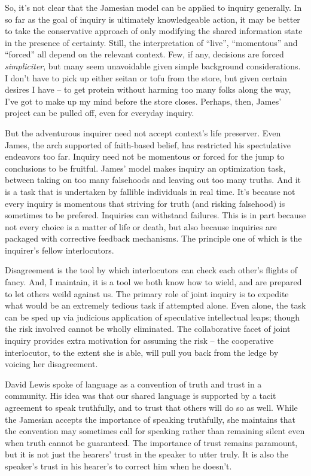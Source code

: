 \documentclass[letterpaper,10pt]{article}
\begin{document}
So, it's not clear that the Jamesian model can be applied to inquiry generally.  In so far as the goal of inquiry is ultimately knowledgeable action, it may be better to take the conservative approach of only modifying the shared information state in the presence of certainty. Still, the interpretation of ``live'', ``momentous'' and ``forced'' all depend on the relevant context.  Few, if any, decisions are forced \textit{simpliciter}, but many seem unavoidable given simple background considerations.  I don't have to pick up either seitan or tofu from the store, but given certain desires I have -- to get protein without harming too many folks along the way, I've got to make up my mind before the store closes.  Perhaps, then, James' project can be pulled off, even for everyday inquiry.

But the adventurous inquirer need not accept context's life preserver.  Even James, the arch supported of faith-based belief, has restricted his spectulative endeavors too far.  Inquiry need not be momentous or forced for the jump to conclusions to be fruitful.  James' model makes inquiry an optimization task, between taking on too many falsehoods and leaving out too many truths.  And it is a task that is undertaken by fallible individuals in real time.  It's because not every inquiry is momentous that striving for truth (and risking falsehood) is sometimes to be prefered. Inquiries can withstand failures.  This is in part because not every choice is a matter of life or death, but also because inquiries are packaged with corrective feedback mechanisms.  The principle  one of which is the inquirer's fellow interlocutors.

Disagreement is the tool by which interlocutors can check each other's flights of fancy.  And, I maintain, it is a tool we both know how to wield, and are prepared to let others weild against us.  The primary role of joint inquiry is to expedite what would be an extremely tedious task if attempted alone.  Even alone, the task can be sped up via judicious application of speculative intellectual leaps; though the risk involved cannot be wholly eliminated.  The collaborative facet of joint inquiry provides extra motivation for assuming the risk -- the cooperative interlocutor, to the extent she is able, will pull you back from the ledge by voicing her disagreement. 

David Lewis spoke of language as a convention of truth and trust in a community.  His idea was that our shared language is supported by a tacit agreement to speak truthfully, and to trust that others will do so as well.  While the Jamesian accepts the importance of speaking truthfully, she maintains that the convention may sometimes call for speaking rather than remaining silent even when truth cannot be guaranteed.  The importance of trust remains paramount, but it is not just the hearers' trust in the speaker to utter truly.  It is also the speaker's trust in his hearer's to correct him when he doesn't.
\end{document}
